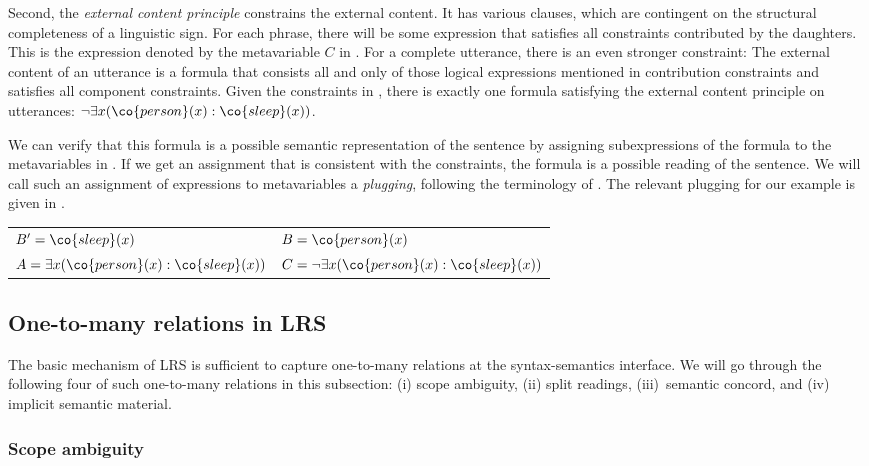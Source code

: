 \documentclass[output=paper]{langsci/langscibook}
\begin{document}
Second, the \emph{external content principle} constrains the external content. It has various clauses, which are contingent on 
 the structural completeness of a linguistic sign. 
For each phrase, there will be some expression that satisfies all constraints contributed by the daughters. 
This is the expression denoted by the metavariable $C$ in . 
For a complete utterance, there is an even stronger constraint: The external content of an utterance is a formula that consists all and only of those logical expressions mentioned in contribution constraints and satisfies all component constraints. Given the constraints in , there is exactly one formula satisfying the external content principle on utterances: $\lnot \exists x (\co{person}(x) : \co{sleep}(x))$.

We can verify that this formula is a possible semantic representation of the sentence by assigning  subexpressions of the formula to the metavariables in . 
If we get an assignment that is consistent with the constraints, the formula is a possible reading of the sentence. 
We will call such an assignment of expressions to metavariables a \emph{plugging}, following the terminology of \citet{Bos:96}.
The relevant plugging for our example is given in .

\ea \label{schlaeft-plug}
\begin{tabular}[t]{ll}
$B' = \co{sleep}(x)$ & 
$B = \co{person}(x)$\\
$A = \exists x (\co{person}(x):\co{sleep}(x))$ & 
$C = \lnot \exists x (\co{person}(x):\co{sleep}(x))$
\end{tabular}

\z

\subsection{One-to-many relations in LRS}
\label{Sec-LRS-One2Many}

The basic mechanism of LRS is sufficient to capture one-to-many relations at the syntax-semantics interface. 
We will go through the following four of such one-to-many relations in this subsection: (i) scope ambiguity, (ii) split readings, (iii)~semantic concord, and (iv) implicit semantic material.

\subsubsection{Scope ambiguity}
\label{Sec-LRS-Ambig}
\end{document}
